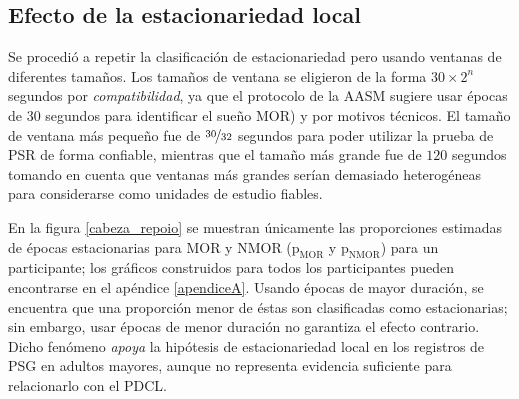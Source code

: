 \documentclass[12pt,letterpaper]{book}
\begin{document}

\subsection*{Efecto de la estacionariedad local}

Se procedió a repetir la clasificación de estacionariedad pero usando ventanas de diferentes tamaños.
%
Los tamaños de ventana se eligieron de la forma $30 \times 2^{n}$ segundos por \textit{compatibilidad}, ya que el protocolo de la AASM sugiere usar épocas de 30 segundos para identificar el sueño MOR) y por motivos técnicos.
%
El tamaño de ventana más pequeño fue de $\nicefrac{30}{32}$ segundos para poder utilizar la prueba de PSR de forma confiable, mientras que el tamaño más grande fue de $120$ segundos tomando en cuenta que ventanas más grandes serían demasiado heterogéneas para considerarse como unidades de estudio fiables.

En la figura \ref{cabeza_repoio} se muestran únicamente las proporciones estimadas de épocas estacionarias para MOR y NMOR ($\text{p}_{\text{MOR}}$ y $\text{p}_{\text{NMOR}}$) para un participante; los gráficos construidos para todos los participantes pueden encontrarse en el apéndice \ref{apendiceA}.
%
Usando épocas de mayor duración, se encuentra que una proporción menor de éstas son clasificadas como estacionarias; sin embargo, usar épocas de menor duración no garantiza el efecto contrario.
%
Dicho fenómeno \textit{apoya} la hipótesis de estacionariedad local en los registros de PSG en adultos mayores, aunque no representa evidencia suficiente para relacionarlo con el PDCL.
\end{document}
